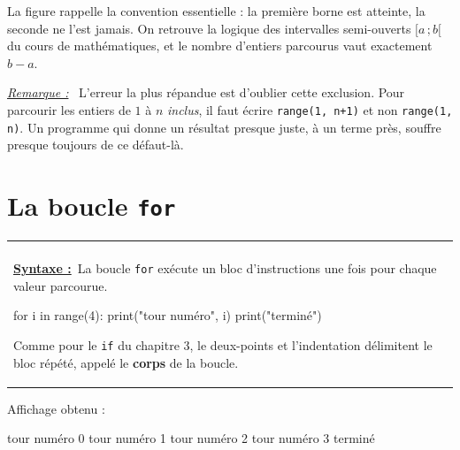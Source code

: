 \documentclass[a4paper,11pt,openany]{book}
\makeatletter
\newcommand{\mot}[1]{\textcolor{rougecours}{\textbf{#1}}}
\newcommand{\code}[1]{\texttt{\textcolor{codebleu}{#1}}}
\newenvironment{cadre}%
 {\par\vspace{2mm}\noindent\begin{tabular}{|@{\hspace{4mm}}p{0.93\textwidth}@{\hspace{4mm}}|}
  \hline \\[-2mm]}%
 {\\[2mm] \hline \end{tabular}\par\vspace{3mm}}
\newcommand{\syntaxe}{\textbf{\underline{Syntaxe :}}~}
\newenvironment{remarque}%
 {\par\vspace{1mm}\begin{list}{}{\leftmargin=1cm \rightmargin=0.5cm}\item[]%
  \textit{\underline{Remarque :}}~}%
 {\end{list}\vspace{1mm}}
\makeatother
\begin{document}
\begin{center}
\end{center}

La figure rappelle la convention essentielle : la première borne est atteinte, la seconde ne l'est jamais. On retrouve la logique des intervalles semi-ouverts $[a\,;b[$ du cours de mathématiques, et le nombre d'entiers parcourus vaut exactement $b - a$.

\begin{remarque}
L'erreur la plus répandue est d'oublier cette exclusion. Pour parcourir les entiers de $1$ à $n$ \emph{inclus}, il faut écrire \code{range(1, n+1)} et non \code{range(1, n)}. Un programme qui donne un résultat presque juste, à un terme près, souffre presque toujours de ce défaut-là.
\end{remarque}

\section{La boucle \texttt{for}}

\begin{cadre}
\syntaxe La boucle \code{for} exécute un bloc d'instructions une fois pour chaque valeur parcourue.
\begin{python}
for i in range(4):
    print("tour numéro", i)
print("terminé")
\end{python}
Comme pour le \code{if} du chapitre 3, le deux-points et l'indentation délimitent le bloc répété, appelé le \mot{corps} de la boucle.
\end{cadre}

Affichage obtenu :

\begin{sortie}
tour numéro 0
tour numéro 1
tour numéro 2
tour numéro 3
terminé
\end{sortie}
\end{document}

